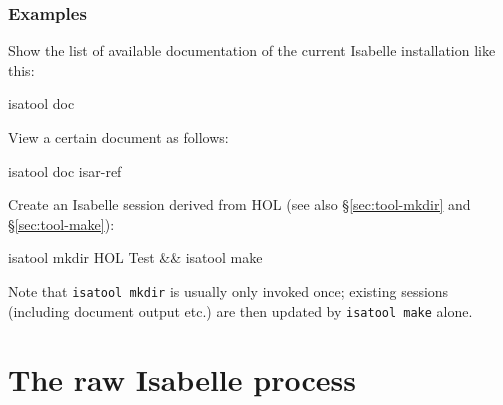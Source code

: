 \subsubsection*{Examples}

Show the list of available documentation of the current Isabelle installation
like this:
\begin{ttbox}
  isatool doc
\end{ttbox}

View a certain document as follows:
\begin{ttbox}
  isatool doc isar-ref
\end{ttbox}

Create an Isabelle session derived from HOL (see also \S\ref{sec:tool-mkdir}
and \S\ref{sec:tool-make}):
\begin{ttbox}
  isatool mkdir HOL Test && isatool make
\end{ttbox}
Note that \texttt{isatool mkdir} is usually only invoked once; existing
sessions (including document output etc.) are then updated by \texttt{isatool
  make} alone.


\section{The raw Isabelle process}

